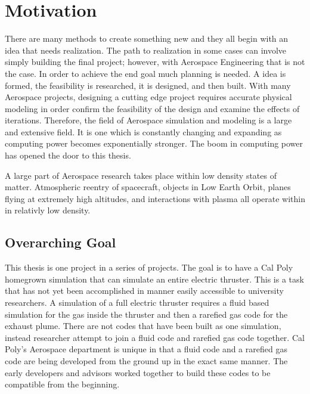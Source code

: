 \section{Motivation}
There are many methods to create something new and they all begin with an idea that needs realization. The path to realization in some cases can involve simply building the final project; however, with Aerospace Engineering that is not the case. In order to achieve the end goal much planning is needed. A idea is formed, the feasibility is researched, it is designed, and then built. With many Aerospace projects, designing a cutting edge project requires accurate physical modeling in order confirm the feasibility of the design and examine the effects of iterations. Therefore, the field of Aerospace simulation and modeling is a large and extensive field. It is one which is constantly changing and expanding as computing power becomes exponentially stronger. The boom in computing power has opened the door to this thesis. \par

\indent A large part of Aerospace research takes place within low density states of matter. Atmospheric reentry of spacecraft, objects in Low Earth Orbit, planes flying at extremely high altitudes, and interactions with plasma all operate within in relativly low density. 

\subsection{Overarching Goal}
This thesis is one project in a series of projects. The goal is to have a Cal Poly homegrown simulation that can simulate an entire electric thruster. This is a task that has not yet been accomplished in manner easily accessible to university researchers. A simulation of a full electric thruster requires a fluid based simulation for the gas inside the thruster and then a rarefied gas code for the exhaust plume. There are not codes that have been built as one simulation, instead researcher attempt to join a fluid code and rarefied gas code together. Cal Poly’s Aerospace department is unique in that a fluid code and a rarefied gas code are being developed from the ground up in the exact same manner. The early developers and advisors worked together to build these codes to be compatible from the beginning. \par

